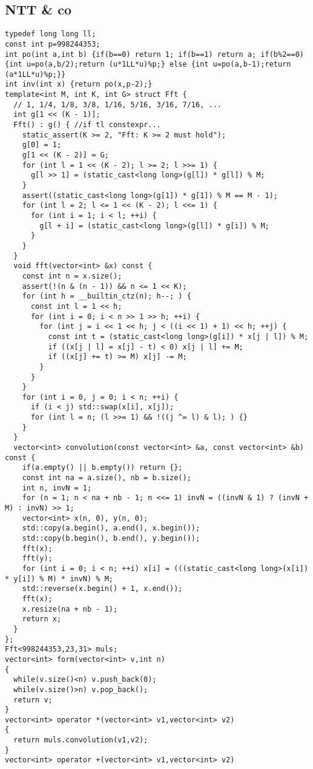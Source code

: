 \subsection{NTT \& co}
\begin{lstlisting}
typedef long long ll;
const int p=998244353;
int po(int a,int b) {if(b==0) return 1; if(b==1) return a; if(b%2==0) {int u=po(a,b/2);return (u*1LL*u)%p;} else {int u=po(a,b-1);return (a*1LL*u)%p;}}
int inv(int x) {return po(x,p-2);}
template<int M, int K, int G> struct Fft {
  // 1, 1/4, 1/8, 3/8, 1/16, 5/16, 3/16, 7/16, ...
  int g[1 << (K - 1)];
  Fft() : g() { //if tl constexpr...
    static_assert(K >= 2, "Fft: K >= 2 must hold");
    g[0] = 1;
    g[1 << (K - 2)] = G;
    for (int l = 1 << (K - 2); l >= 2; l >>= 1) {
      g[l >> 1] = (static_cast<long long>(g[l]) * g[l]) % M;
    }
    assert((static_cast<long long>(g[1]) * g[1]) % M == M - 1);
    for (int l = 2; l <= 1 << (K - 2); l <<= 1) {
      for (int i = 1; i < l; ++i) {
        g[l + i] = (static_cast<long long>(g[l]) * g[i]) % M;
      }
    }
  }
  void fft(vector<int> &x) const {
    const int n = x.size();
    assert(!(n & (n - 1)) && n <= 1 << K);
    for (int h = __builtin_ctz(n); h--; ) {
      const int l = 1 << h;
      for (int i = 0; i < n >> 1 >> h; ++i) {
        for (int j = i << 1 << h; j < ((i << 1) + 1) << h; ++j) {
          const int t = (static_cast<long long>(g[i]) * x[j | l]) % M;
          if ((x[j | l] = x[j] - t) < 0) x[j | l] += M;
          if ((x[j] += t) >= M) x[j] -= M;
        }
      }
    }
    for (int i = 0, j = 0; i < n; ++i) {
      if (i < j) std::swap(x[i], x[j]);
      for (int l = n; (l >>= 1) && !((j ^= l) & l); ) {}
    }
  }
  vector<int> convolution(const vector<int> &a, const vector<int> &b) const {
    if(a.empty() || b.empty()) return {};
    const int na = a.size(), nb = b.size();
    int n, invN = 1;
    for (n = 1; n < na + nb - 1; n <<= 1) invN = ((invN & 1) ? (invN + M) : invN) >> 1;
    vector<int> x(n, 0), y(n, 0);
    std::copy(a.begin(), a.end(), x.begin());
    std::copy(b.begin(), b.end(), y.begin());
    fft(x);
    fft(y);
    for (int i = 0; i < n; ++i) x[i] = (((static_cast<long long>(x[i]) * y[i]) % M) * invN) % M;
    std::reverse(x.begin() + 1, x.end());
    fft(x);
    x.resize(na + nb - 1);
    return x;
  }
};
Fft<998244353,23,31> muls;
vector<int> form(vector<int> v,int n)
{
  while(v.size()<n) v.push_back(0);
  while(v.size()>n) v.pop_back();
  return v;
}
vector<int> operator *(vector<int> v1,vector<int> v2)
{
  return muls.convolution(v1,v2);
}
vector<int> operator +(vector<int> v1,vector<int> v2)

\end{lstlisting}
